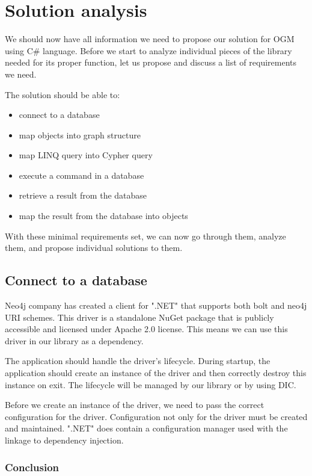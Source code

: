 \chapter {Solution analysis}

We should now have all information we need to propose our solution for OGM using C\# language. Before we start to analyze individual pieces of the library needed for its proper function, let us propose and discuss a list of requirements we need.

The solution should be able to:
\begin{itemize}
    \item {connect to a database}
    \item {map objects into graph structure}
    \item {map LINQ query into Cypher query}
    \item {execute a command in a database}
    \item {retrieve a result from the database}
    \item {map the result from the database into objects}
\end{itemize}

With these minimal requirements set, we can now go through them, analyze them, and propose individual solutions to them.

\section{Connect to a database}

Neo4j company has created a client for ".NET" that supports both bolt and neo4j URI schemes. \cite{noauthor_client_nodate} This driver is a standalone NuGet package that is publicly accessible and licensed under Apache 2.0 license. This means we can use this driver in our library as a dependency.

The application should handle the driver's lifecycle. During startup, the application should create an instance of the driver and then correctly destroy this instance on exit. The lifecycle will be managed by our library or by using DIC.

Before we create an instance of the driver, we need to pass the correct configuration for the driver. Configuration not only for the driver must be created and maintained. ".NET" does contain a configuration manager used with the linkage to dependency injection.

\subsection{Conclusion}

